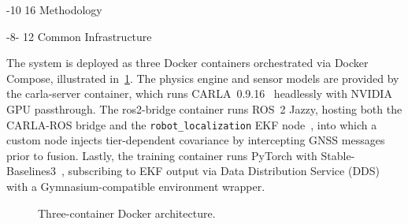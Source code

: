 \documentclass{sig-alternate}
\makeatletter
\renewcommand\section{\@startsection{section}{1}{\z@}%
    {-10\p@ \@plus -4\p@ \@minus -2\p@}%
    {16\p@}%
    {\baselineskip 14pt\secfnt\@ucheadtrue}}
\renewcommand\subsection{\@startsection{subsection}{2}{\z@}%
    {-8\p@ \@plus -2\p@ \@minus -\p@}%
    {12\p@}%
    {\secfnt}}
\makeatother
\begin{document}

\section{Methodology}
\label{sec:methodology}

\subsection{Common Infrastructure}

The system is deployed as three Docker containers orchestrated via Docker Compose, illustrated in~\cref{fig:architecture}. The physics engine and sensor models are provided by the carla-server container, which runs CARLA~0.9.16~\cite{dosovitskiy2017carla} headlessly with NVIDIA GPU passthrough. The ros2-bridge container runs ROS~2 Jazzy, hosting both the CARLA-ROS bridge and the \texttt{robot\_localization} EKF node~\cite{moore2014ekf}, into which a custom node injects tier-dependent covariance by intercepting GNSS messages prior to fusion. Lastly, the training container runs PyTorch with Stable-Baselines3~\cite{raffin2021sb3}, subscribing to EKF output via Data Distribution Service (DDS) with a Gymnasium-compatible environment wrapper.

\begin{figure}[htbp]
\centering
{}%
\caption{Three-container Docker architecture.\label{fig:architecture}}
\end{figure}
\end{document}
